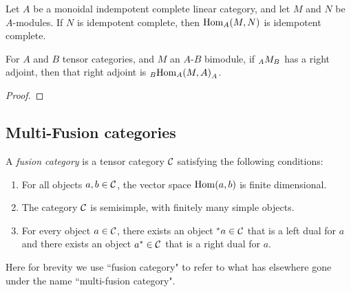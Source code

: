 \documentclass{amsart}
\begin{document}
\begin{example}
\end{example}


\begin{proposition} 
Let $A$ be a  monoidal indempotent complete linear category, and let $M$ and $N$ be $A$-modules.  If $N$ is idempotent complete, then $\operatorname{Hom}_A(M,N)$ is idempotent complete.
\end{proposition}

\begin{corollary}
For $A$ and $B$ tensor categories, and $M$ an $A$-$B$ bimodule, if ${}_{A} {M}_{B}$ has a right adjoint, then that right adjoint is ${}_{B} {\operatorname{Hom}_A(M,A)}_{A}$.
\end{corollary}

\begin{proof}
\end{proof}


\subsection{Multi-Fusion categories} \label{sec-tc-fusion}


\begin{definition}
A \emph{fusion category} is a tensor category $\mathcal C$ satisfying the following conditions:
\begin{enumerate}
\item For all objects $a, b \in \mathcal C$, the vector space $\operatorname{Hom}(a,b)$ is finite dimensional.
\item The category $\mathcal C$ is semisimple, with finitely many simple objects.
\item For every object $a \in \mathcal C$, there exists an object ${}^*{a} \in \mathcal C$ that is a left dual for $a$ and there exists an object ${a}^* \in \mathcal C$ that is a right dual for $a$.
\end{enumerate}
\end{definition}

\begin{remark}
Here for brevity we use ``fusion category" to refer to what has elsewhere gone under the name ``multi-fusion category".
\end{remark}
\end{document}
